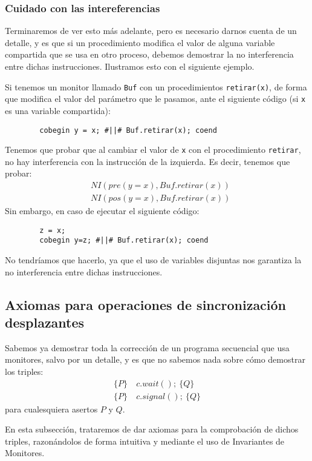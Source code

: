 \subsubsection{Cuidado con las intereferencias}
Terminaremos de ver esto más adelante, pero es necesario darnos cuenta de un detalle, y es que si un procedimiento modifica el valor de alguna variable compartida que se usa en otro proceso, debemos demostrar la no interferencia entre dichas instrucciones. Ilustramos esto con el siguiente ejemplo.
\begin{ejemplo}
    Si tenemos un monitor llamado \verb|Buf| con un procedimientos \verb|retirar(x)|, de forma que modifica el valor del parámetro que le pasamos, ante el siguiente código (si \verb|x| es una variable compartida):
    \begin{verbatim}
        cobegin y = x; #||# Buf.retirar(x); coend
    \end{verbatim}
    Tenemos que probar que al cambiar el valor de \verb|x| con el procedimiento \verb|retirar|, no hay interferencia con la instrucción de la izquierda. Es decir, tenemos que probar:
    \begin{align*}
        &NI(pre(y=x), Buf.retirar(x)) \\
        &NI(pos(y=x), Buf.retirar(x))
    \end{align*}
    Sin embargo, en caso de ejecutar el siguiente código:
    \begin{verbatim}
        z = x;
        cobegin y=z; #||# Buf.retirar(x); coend
    \end{verbatim}
    No tendríamos que hacerlo, ya que el uso de variables disjuntas nos garantiza la no interferencia entre dichas instrucciones.
\end{ejemplo}

\subsection{Axiomas para operaciones de sincronización desplazantes}\label{sec:ax_desplazantes}
Sabemos ya demostrar toda la corrección de un programa secuencial que usa monitores, salvo por un detalle, y es que no sabemos nada sobre cómo demostrar los triples:
\begin{align*}
    \{P\}\ &c.wait();\ \{Q\} \\
    \{P\}\ &c.signal();\ \{Q\}
\end{align*}
para cualesquiera asertos $P$ y $Q$.

En esta subsección, trataremos de dar axiomas para la comprobación de dichos triples, razonándolos de forma intuitiva y mediante el uso de Invariantes de Monitores.\\

